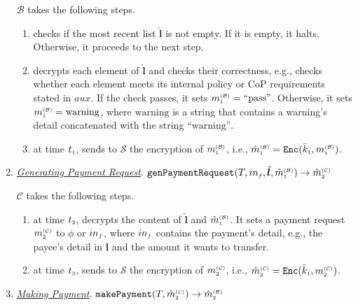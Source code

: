 \begin{enumerate}
$\mathcal{B}$ takes the following steps. 
\begin{enumerate}
%
\item  checks if the most recent list $\hat{\bm{l}}$ is not empty. If it is empty, it halts. Otherwise, it proceeds to the next step. 
%
\item  decrypts each element of $\hat{\bm l}$ and checks their correctness, e.g., checks whether each element meets its internal policy or CoP requirements stated in $aux$. If the check passes, it sets $m_{\scriptscriptstyle 1}^{\scriptscriptstyle(\mathcal{B})}= \text{``pass''}$. Otherwise, it sets $m_{\scriptscriptstyle 1}^{\scriptscriptstyle(\mathcal{B})}=\text{warning}$, where $\text{warning}$ is a  string that contains a warning's detail concatenated with the string $\text{``warning''}$.
%
\item at time $t_{\scriptscriptstyle 1}$, sends to $\mathcal{S}$ the encryption of $m_{\scriptscriptstyle 1}^{\scriptscriptstyle(\mathcal{B})}$, i.e.,  $\hat m_{\scriptscriptstyle 1}^{\scriptscriptstyle(\mathcal{B})}= \mathtt{Enc}(\bar k_{\scriptscriptstyle 1}, m_{\scriptscriptstyle 1}^{\scriptscriptstyle(\mathcal B)})$. 
\end{enumerate}


\vspace{2mm}
\item\label{clinet-at-T2} \underline{\textit{Generating Payment Request}}. $\mathtt{genPaymentRequest}(T, in_{\scriptscriptstyle f}, \hat{\bm{l}}, \hat m^{\scriptscriptstyle\mathcal{(B)}}_{\scriptscriptstyle1})\rightarrow \hat m^{\scriptscriptstyle\mathcal{(C)}}_{\scriptscriptstyle2}$

$\mathcal{C}$ takes the following steps. 
\begin{enumerate}
%
\item at time $t_{\scriptscriptstyle 2}$, decrypts the content of $\hat{\bm{l}}$ and $\hat m_{\scriptscriptstyle 1}^{\scriptscriptstyle(\mathcal{B})}$.  It sets a payment request $m_{\scriptscriptstyle 2}^{\scriptscriptstyle(\mathcal C)}$ to  $\phi$ or  $in_{\scriptscriptstyle f}$, where $in_{\scriptscriptstyle f}$ contains the payment's detail, e.g., the payee's detail in $\bm l$ and the amount it wants to transfer. 
%
\item at time $t_{\scriptscriptstyle 3}$, sends  to $\mathcal{S}$ the encryption of $m_{\scriptscriptstyle 2}^{\scriptscriptstyle(\mathcal C)}$, i.e., $\hat m_{\scriptscriptstyle 2}^{\scriptscriptstyle(\mathcal{C})}= \mathtt{Enc}(\bar k_{\scriptscriptstyle 1}, m_{\scriptscriptstyle 2}^{\scriptscriptstyle(\mathcal C)})$.
\end{enumerate}
%
\vspace{2mm}
\item \underline{\textit{Making Payment}}. $\mathtt{makePayment}(T, \hat m^{\scriptscriptstyle\mathcal{(C)}}_{\scriptscriptstyle2})\rightarrow \hat m^{\scriptscriptstyle\mathcal{(B)}}_{\scriptscriptstyle2}$


\end{enumerate}
